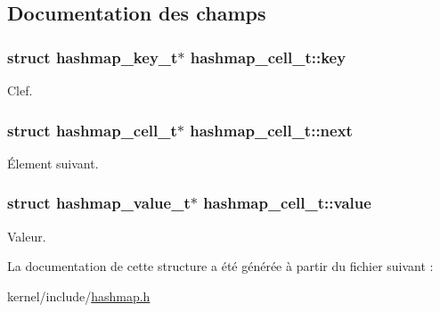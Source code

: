 \subsection{Documentation des champs}
\hypertarget{structhashmap__cell__t_a18fa668e172072e9bff5e92e52d9f3af}{
\subsubsection[{key}]{\setlength{\rightskip}{0pt plus 5cm}struct hashmap\-\_\-key\-\_\-t$\ast$ hashmap\-\_\-cell\-\_\-t\-::key}}\label{structhashmap__cell__t_a18fa668e172072e9bff5e92e52d9f3af}
Clef. \hypertarget{structhashmap__cell__t_afea1a8c217d80c95efa5b4a89ea07bf2}{
\subsubsection[{next}]{\setlength{\rightskip}{0pt plus 5cm}struct {\bf hashmap\-\_\-cell\-\_\-t}$\ast$ hashmap\-\_\-cell\-\_\-t\-::next}}\label{structhashmap__cell__t_afea1a8c217d80c95efa5b4a89ea07bf2}
Élement suivant. \hypertarget{structhashmap__cell__t_aa0758cf139adb3747a846e539d01d75d}{
\subsubsection[{value}]{\setlength{\rightskip}{0pt plus 5cm}struct hashmap\-\_\-value\-\_\-t$\ast$ hashmap\-\_\-cell\-\_\-t\-::value}}\label{structhashmap__cell__t_aa0758cf139adb3747a846e539d01d75d}
Valeur. 

La documentation de cette structure a été générée à partir du fichier suivant \-:\begin{DoxyCompactItemize}
\item 
kernel/include/\hyperlink{hashmap_8h}{hashmap.\-h}\end{DoxyCompactItemize}
